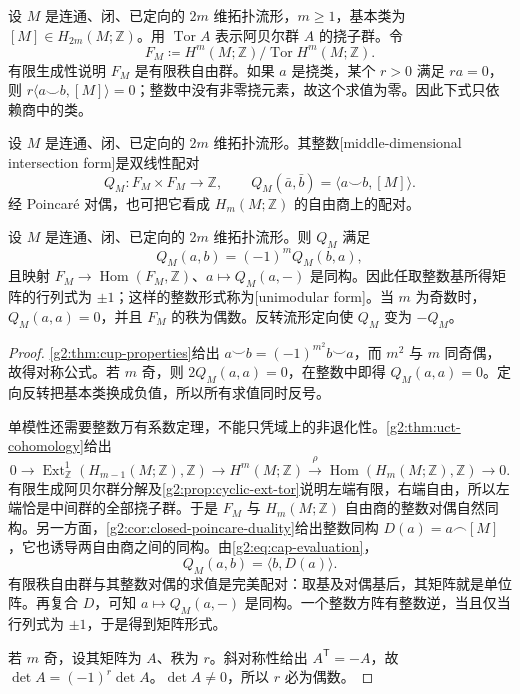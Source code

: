 设 \(M\) 是连通、闭、已定向的 \(2m\) 维拓扑流形，\(m\geq1\)，基本类为 \([M]\in H_{2m}(M;\mathbb Z)\)。用 \(\operatorname{Tor}A\) 表示阿贝尔群 \(A\) 的挠子群。令
\[
	F_M\coloneqq H^m(M;\mathbb Z)/\operatorname{Tor}H^m(M;\mathbb Z).
\]
有限生成性说明 \(F_M\) 是有限秩自由群。如果 \(a\) 是挠类，某个 \(r>0\) 满足 \(ra=0\)，则 \(r\langle a\smile b,[M]\rangle=0\)；整数中没有非零挠元素，故这个求值为零。因此下式只依赖商中的类。

\begin{definition}[中维交形式]\label{g2:def:intersection-form}
	设 \(M\) 是连通、闭、已定向的 \(2m\) 维拓扑流形。其整数[middle-dimensional intersection form]是双线性配对
	\begin{equation}\label{g2:eq:intersection-form}
		Q_M:F_M\times F_M\longrightarrow\mathbb Z,
		\qquad Q_M(\bar a,\bar b)=\langle a\smile b,[M]\rangle.
	\end{equation}
	经 Poincaré 对偶，也可把它看成 \(H_m(M;\mathbb Z)\) 的自由商上的配对。
\end{definition}

\begin{theorem}\label{g2:thm:intersection-unimodular}
	设 \(M\) 是连通、闭、已定向的 \(2m\) 维拓扑流形。则 \(Q_M\) 满足
	\[
		Q_M(a,b)=(-1)^mQ_M(b,a),
	\]
	且映射 \(F_M\to\operatorname{Hom}(F_M,\mathbb Z)\)、\(a\mapsto Q_M(a,-)\) 是同构。因此任取整数基所得矩阵的行列式为 \(\pm1\)；这样的整数形式称为[unimodular form]。当 \(m\) 为奇数时，\(Q_M(a,a)=0\)，并且 \(F_M\) 的秩为偶数。反转流形定向使 \(Q_M\) 变为 \(-Q_M\)。
\end{theorem}
\begin{proof}
	\cref{g2:thm:cup-properties}给出 \(a\smile b=(-1)^{m^2}b\smile a\)，而 \(m^2\) 与 \(m\) 同奇偶，故得对称公式。若 \(m\) 奇，则 \(2Q_M(a,a)=0\)，在整数中即得 \(Q_M(a,a)=0\)。定向反转把基本类换成负值，所以所有求值同时反号。

	单模性还需要整数万有系数定理，不能只凭域上的非退化性。\cref{g2:thm:uct-cohomology}给出
	\[
		0\longrightarrow\operatorname{Ext}^1_{\mathbb Z}(H_{m-1}(M;\mathbb Z),\mathbb Z)
		\longrightarrow H^m(M;\mathbb Z)\xrightarrow{\rho}\operatorname{Hom}(H_m(M;\mathbb Z),\mathbb Z)\longrightarrow0.
	\]
	有限生成阿贝尔群分解及\cref{g2:prop:cyclic-ext-tor}说明左端有限，右端自由，所以左端恰是中间群的全部挠子群。于是 \(F_M\) 与 \(H_m(M;\mathbb Z)\) 自由商的整数对偶自然同构。另一方面，\cref{g2:cor:closed-poincare-duality}给出整数同构 \(D(a)=a\frown[M]\)，它也诱导两自由商之间的同构。由\eqref{g2:eq:cap-evaluation}，
	\[
		Q_M(a,b)=\langle b,D(a)\rangle.
	\]
	有限秩自由群与其整数对偶的求值是完美配对：取基及对偶基后，其矩阵就是单位阵。再复合 \(D\)，可知 \(a\mapsto Q_M(a,-)\) 是同构。一个整数方阵有整数逆，当且仅当行列式为 \(\pm1\)，于是得到矩阵形式。

	若 \(m\) 奇，设其矩阵为 \(A\)、秩为 \(r\)。斜对称性给出 \(A^{\mathsf T}=-A\)，故 \(\det A=(-1)^r\det A\)。\(\det A\ne0\)，所以 \(r\) 必为偶数。
\end{proof}

